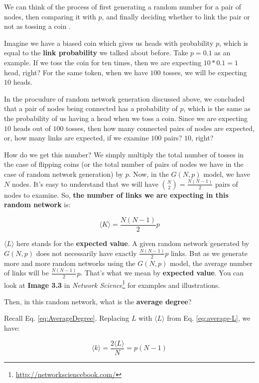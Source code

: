 \documentclass[
]{krantz}
\renewcommand{\href}[2]{#2\footnote{\url{#1}}}
\begin{document}
We can think of the process of first generating a random number for a pair of nodes, then comparing it with \(p\), and finally deciding whether to link the pair or not as tossing a coin \citep{menczer2020first}.

Imagine we have a biased coin which gives us heads with probability \(p\), which is equal to the \textbf{link probability} we talked about before. Take \(p=0.1\) as an example. If we toss the coin for ten times, then we are expecting \(10*0.1=1\) head, right? For the same token, when we have \(100\) tosses, we will be expecting \(10\) heads.

In the procudure of random network generation discussed above, we concluded that a pair of nodes being connected has a probability of \(p\), which is the same as the probability of us having a head when we toss a coin. Since we are expecting \(10\) heads out of \(100\) tosses, then how many connected pairs of nodes are expected, or, how many links are expected, if we examine \(100\) pairs? \(10\), right?

How do we get this number? We simply multiply the total number of tosses in the case of flipping coins (or the total number of pairs of nodes we have in the case of random network generation) by \(p\).
Now, in the \(G(N,p)\) model, we have \(N\) nodes. It's easy to understand that we will have \({N \choose 2} = \frac{N(N-1)}{2}\) pairs of nodes to examine. So, \textbf{the number of links we are expecting in this random network} is:

\begin{equation}
  \langle K \rangle = \frac{N(N-1)}{2}p \label{eq:average-L}
\end{equation}

\(\langle L \rangle\) here stands for the \textbf{expected value}. A given random network generated by \(G(N,p)\) does not necessarily have exactly \(\frac{N(N-1)}{2}p\) links. But as we generate more and more random networks using the \(G(N,p)\) model, the average number of links will be \(\frac{N(N-1)}{2}p\). That's what we mean by \textbf{expected value}. You can look at \textbf{Image 3.3} in \href{http://networksciencebook.com/}{\emph{Network Science}} for examples and illustrations.

Then, in this random network, what is the \textbf{average degree}?

Recall Eq. \eqref{eq:AverageDegree}. Replacing \(L\) with \(\langle L \rangle\) from Eq. \eqref{eq:average-L}, we have:

\begin{equation}
  \langle k \rangle = \frac{2\langle L \rangle}{N} = p(N-1) \label{eq:average-D}
\end{equation}
\end{document}
